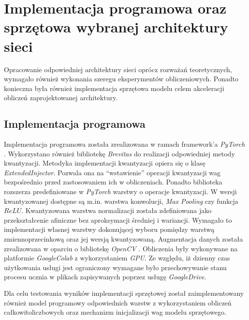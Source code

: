 \chapter{Implementacja programowa oraz sprzętowa wybranej architektury sieci}
\label{cha:Implementacja}

Opracowanie odpowiedniej architektury sieci oprócz rozważań teoretycznych, wymagało również wykonania szeregu eksperymentów obliczeniowych.
Ponadto konieczna była również implementacja sprzętowa modelu celem akceleracji obliczeń zaprojektowanej architektury.

\section{Implementacja programowa}

Implementacja programowa została zrealizowana w ramach framework'a \emph{PyTorch} \cite{pytorch}.
Wykorzystano również bibliotekę \emph{Brevitas} \cite{brevitas} do realizacji odpowiedniej metody kwantyzacji.
Metodyka implementacji kwantyzacji opiera się o klasę \emph{ExtendedInjector}.
Pozwala ona na ``wstawienie'' operacji kwantyzacji wag bezpośrednio przed zastosowaniem ich w obliczeniach.
Ponadto biblioteka rozszerza predefiniowane w \emph{PyTorch} warstwy o operacje kwantyzacji. 
W wersji kwantyzowanej dostępne są m.in. warstwa konwolucji, \emph{Max Pooling} czy funkcja $ReLU$.
Kwantyzowana warstwa normalizacji została zdefiniowana jako przekształcenie afiniczne bez aproksymacji średniej i wariancji.
Wymagało to implementacji własnej warstwy dokonującej wyboru pomiędzy warstwą zmiennoprzecinkową oraz jej wersją kwantyzowaną.
Augmentacja danych została zrealizowana w oparciu o bibliotekę \emph{OpenCV} \cite{opencv}.
Obliczenia były wykonywane na platformie \emph{GoogleColab} \cite{colab} z wykorzystaniem \emph{GPU}.
Ze względu, iż dzienny czas użytkowania usługi jest ograniczony wymagane było przechowywanie stanu procesu ucznia w plikach zapisywanych poprzez usługę \emph{GoogleDrive}.

Dla celu testowania wyników implementacji sprzętowej został zaimplementowany również model programowy odpowiednich warstw z wykorzystaniem obliczeń całkowitoliczbowych oraz mechanizm inicjalizacji wag modelu sprzętowego.

